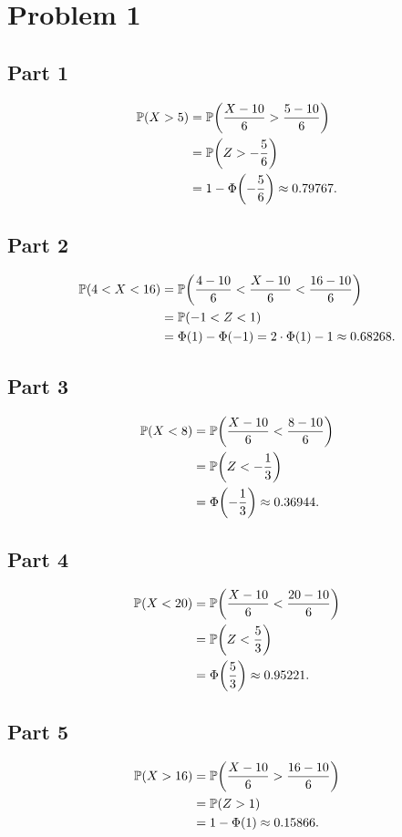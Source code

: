 \documentclass[12pt]{extarticle}
\begin{document}
\section*{Problem 1}
\subsection*{Part 1}
\begin{align*}
	\mathbb{P}\qty(X > 5) &= \mathbb{P}\qty(\frac{X - 10}{6} > \frac{5 - 10}{6}) \\
	&= \mathbb{P}\qty(Z > -\frac{5}{6}) \\
	&= 1 - \Phi\qty(-\frac{5}{6}) \approx 0.79767
.\end{align*}

\subsection*{Part 2}
\begin{align*}
	\mathbb{P}\qty(4 < X < 16) &= \mathbb{P}\qty(\frac{4-10}{6} < \frac{X - 10}{6} < \frac{16 - 10}{6}) \\
					  &= \mathbb{P}\qty(-1 < Z < 1) \\
					  &= \Phi\qty(1) - \Phi(-1) = 2\cdot\Phi(1) - 1 \approx 0.68268
.\end{align*}

\subsection*{Part 3}
\begin{align*}
	\mathbb{P}\qty(X < 8) &= \mathbb{P}\qty(\frac{X - 10}{6} < \frac{8 - 10}{6}) \\
	&= \mathbb{P}\qty(Z < -\frac{1}{3}) \\
	&= \Phi\qty(-\frac{1}{3}) \approx 0.36944
.\end{align*}

\subsection*{Part 4}
\begin{align*}
	\mathbb{P}\qty(X < 20) &= \mathbb{P}\qty(\frac{X - 10}{6} < \frac{20 - 10}{6}) \\
	&= \mathbb{P}\qty(Z < \frac{5}{3}) \\
	&= \Phi\qty(\frac{5}{3}) \approx 0.95221
.\end{align*}

\subsection*{Part 5}
\begin{align*}
	\mathbb{P}\qty(X > 16) &= \mathbb{P}\qty(\frac{X - 10}{6} > \frac{16 - 10}{6}) \\
	&= \mathbb{P}\qty(Z > 1) \\
	&= 1 - \Phi\qty(1) \approx 0.15866
.\end{align*}
\end{document}
